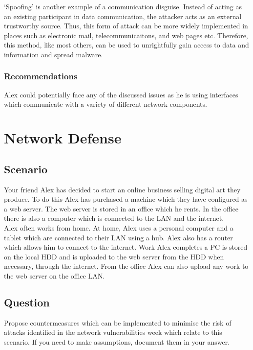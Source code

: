 \documentclass[11pt, english]{article}
\begin{document}
	`Spoofing' is another example of a communication disguise. Instead of acting as an existing participant in data communication, the attacker acts as an external trustworthy source. Thus, this form of attack can be more widely implemented in places such as electronic mail, telecommunicaitons, and web pages etc. Therefore, this method, like most others, can be used to unrightfully gain access to data and information and spread malware.
	
		\subsubsection{Recommendations}

	Alex could potentially face any of the discussed issues as he is using interfaces which communicate with a variety of different network components.

\newpage

\section{Network Defense}

	\subsection{Scenario}

	Your friend Alex has decided to start an online business selling digital art they produce. To do this Alex has purchased a machine which they have configured as a web server. The web server is stored in an office which he rents. In the office there is also a computer which is connected to the LAN and the internet.\\

	Alex often works from home. At home, Alex uses a personal computer and a tablet which are connected to their LAN using a hub. Alex also has a router which allows him to connect to the internet. Work Alex completes a PC is stored on the local HDD and is uploaded to the web server from the HDD when necessary, through the internet. From the office Alex can also upload any work to the web server on the office LAN.

	\subsection{Question}

	Propose countermeasures which can be implemented to minimise the risk of attacks identified in the network vulnerabilities week which relate to this scenario. If you need to make assumptions, document them in your answer.
\end{document}
